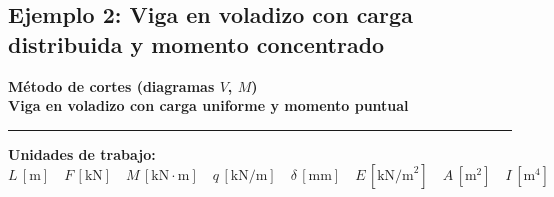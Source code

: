 \subsection{Ejemplo 2: Viga en voladizo con carga distribuida y momento concentrado}

\begin{tcolorbox}[colback=blue!3!white, colframe=blue!40!black, arc=3pt, boxrule=0.8pt, left=8pt, right=8pt, top=6pt, bottom=6pt]
    \centering
    {\Large\bfseries\color{blue!60!black} Método de cortes (diagramas $V$, $M$)}\\[2pt]
    {\normalsize\bfseries Viga en voladizo con carga uniforme y momento puntual}

    \vspace{4pt}\hrule\vspace{4pt}
    {\small\textbf{Unidades de trabajo:} $L\,[\text{m}] \quad F\,[\text{kN}] \quad M\,[\text{kN}\cdot\text{m}] \quad q\,[\text{kN/m}] \quad \delta\,[\text{mm}] \quad E\,[\text{kN/m}^2] \quad A\,[\text{m}^2] \quad I\,[\text{m}^4]$}
\end{tcolorbox}


